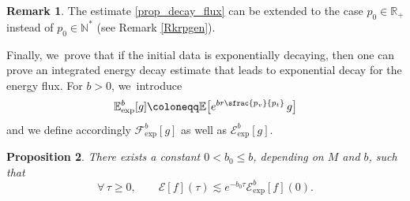 \documentclass[10pt]{amsart}
\theoremstyle{plain}
\newtheorem{proposition}{Proposition}[section]
\theoremstyle{definition}
\newtheorem{remark}[proposition]{Remark}
\newcommand\R{{\mathbb{R}}}
\begin{document}
\begin{remark}
The estimate \eqref{prop_decay_flux} can be extended to the case $p_0\in \R_+$ instead of $p_0\in \mathbb{N}^*$ (see Remark \ref{Rkrpgen}).
\end{remark}

Finally, we~prove that if the initial data is exponentially decaying, then one can prove an integrated energy decay estimate that leads to exponential decay for the energy flux. For $b>0$, we~introduce\vspace*{-3pt}
\[
\mathbb{E}_{\mathrm{exp}}^b[g] \coloneqq \mathbb{E} \bigl[ e^{br \sfrac{p_v}{p_t}} \, g \bigr]
\]
and we define accordingly $\mathcal{F}_{\mathrm{exp}}^b [g]$ as well as $\mathcal{E}_{\mathrm{exp}}^b[g]$.

\begin{proposition}\label{Proexpodec}
There exists a constant $0< b_0 \leq b$, depending on $M$ and $b$, such that\vspace*{-5pt}
\[
\forall \, \tau \geq 0, \qquad \mathcal{E}[f](\tau) \lesssim e^{-b_0 \tau} \mathcal{E}_{\mathrm{exp}}^b[f](0).
\]
\end{proposition}
\end{document}
